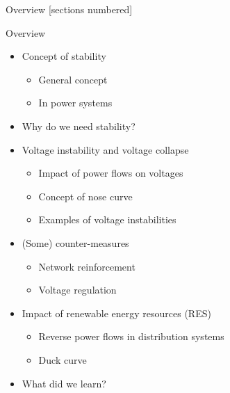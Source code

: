 \titleframe

\begin{frame}{Overview}
  [sections numbered]
  \tableofcontents[hideallsubsections]
\end{frame}





\begin{frame}{Overview}
\begin{itemize}
    \item Concept of stability
    \begin{itemize}
        \item General concept
        \item In power systems
    \end{itemize}
    \item Why do we need stability?
    \item Voltage instability and voltage collapse
    \begin{itemize}
        \item Impact of power flows on voltages
        \item Concept of nose curve
        \item Examples of voltage instabilities
    \end{itemize}
    \item (Some) counter-measures
    \begin{itemize}
        \item Network reinforcement
        \item Voltage regulation
    \end{itemize}
    \item Impact of renewable energy resources (RES)
    \begin{itemize}
        \item Reverse power flows in distribution systems
        \item Duck curve
    \end{itemize}
    \item What did we learn?
\end{itemize}
\end{frame}


